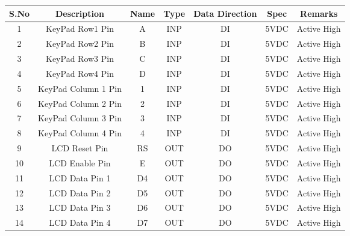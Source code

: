 \documentclass[12pt]{article}
\begin{document}
  \begin{tabular}{|c|c|c|c|c|c|c|}
  \hline
 \textbf{S.No }& \textbf{Description} & \textbf{Name}&\textbf{Type }& \textbf{Data Direction}  &\textbf{ Spec}& \textbf{Remarks} \\
  \hline
  1 & KeyPad Row1 Pin & A & INP  & DI  &5VDC&Active High \\
  \hline
  2 & KeyPad Row2 Pin  &B&INP  & DI  &5VDC&Active High \\
  \hline
  3 &  KeyPad Row3 Pin  & C &INP &DI &5VDC&Active High \\
  \hline
  4 & KeyPad Row4 Pin  & D &INP & DI  & 5VDC&Active High \\
  \hline
  5&KeyPad Column 1 Pin & 1 &INP &DI &5VDC&Active High\\
 \hline
  6 & KeyPad Column 2 Pin& 2 &INP &DI &5VDC&Active High \\
  \hline
  7 &  KeyPad Column 3 Pin & 3 &INP & DI  &5VDC&Active High\\
  \hline
   8 &KeyPad Column 4 Pin& 4 &INP  & DI &5VDC&Active High \\
  \hline
  9 &LCD Reset Pin & RS &OUT &DO&5VDC&Active High \\
  \hline
  10 &LCD Enable Pin & E &OUT &DO &5VDC&Active High \\
  \hline
  11 &LCD Data Pin 1 & D4 &OUT &DO &5VDC&Active High \\
  \hline
  12 & LCD Data Pin 2& D5 &OUT & DO &5VDC&Active High \\
 \hline
  13 & LCD Data Pin 3 & D6 &OUT & DO &5VDC&Active High \\
  \hline
  14 &LCD Data Pin 4 & D7 &OUT& DO &5VDC&Active High \\
  \hline
\end{tabular}
 
\end{document}
